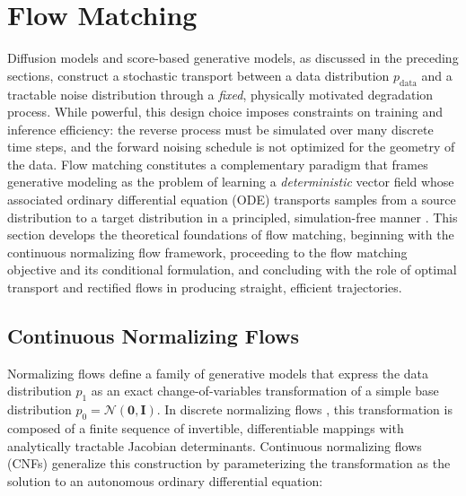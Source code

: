\section{Flow Matching}
\label{sec:flow_matching}

Diffusion models and score-based generative models, as discussed in the preceding sections,
construct a stochastic transport between a data distribution $p_{\text{data}}$ and a tractable
noise distribution through a \emph{fixed}, physically motivated degradation process. While
powerful, this design choice imposes constraints on training and inference efficiency:
the reverse process must be simulated over many discrete time steps, and the forward
noising schedule is not optimized for the geometry of the data. Flow matching constitutes
a complementary paradigm that frames generative modeling as the problem of learning a
\emph{deterministic} vector field whose associated ordinary differential equation (ODE)
transports samples from a source distribution to a target distribution in a principled,
simulation-free manner \cite{lipman2022flow, liu2022flow, albergo2023building}.
This section develops the theoretical foundations of flow matching, beginning with the
continuous normalizing flow framework, proceeding to the flow matching objective and
its conditional formulation, and concluding with the role of optimal transport and
rectified flows in producing straight, efficient trajectories.

\subsection{Continuous Normalizing Flows}
\label{subsec:cnf}

Normalizing flows define a family of generative models that express the data distribution
$p_1$ as an exact change-of-variables transformation of a simple base distribution
$p_0 = \mathcal{N}(\mathbf{0}, \mathbf{I})$. In discrete normalizing flows
\cite{rezende2015variational, dinh2016density}, this transformation is composed of a finite
sequence of invertible, differentiable mappings with analytically tractable Jacobian
determinants. Continuous normalizing flows (CNFs) \cite{chen2018neural} generalize this
construction by parameterizing the transformation as the solution to an autonomous
ordinary differential equation:

